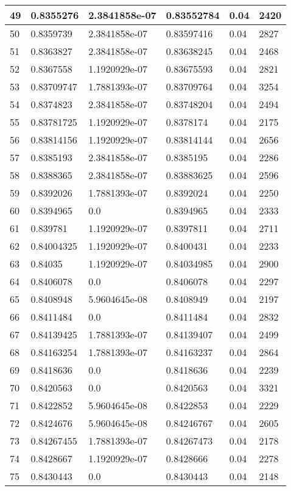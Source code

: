 \begin{longtable}{|l|l|l|l|l|l|}
49 & 0.8355276 & 2.3841858e-07 & 0.83552784 & 0.04 & 2420 \\ \hline 
50 & 0.8359739 & 2.3841858e-07 & 0.83597416 & 0.04 & 2827 \\ \hline 
51 & 0.8363827 & 2.3841858e-07 & 0.83638245 & 0.04 & 2468 \\ \hline 
52 & 0.8367558 & 1.1920929e-07 & 0.83675593 & 0.04 & 2821 \\ \hline 
53 & 0.83709747 & 1.7881393e-07 & 0.83709764 & 0.04 & 3254 \\ \hline 
54 & 0.8374823 & 2.3841858e-07 & 0.83748204 & 0.04 & 2494 \\ \hline 
55 & 0.83781725 & 1.1920929e-07 & 0.8378174 & 0.04 & 2175 \\ \hline 
56 & 0.83814156 & 1.1920929e-07 & 0.83814144 & 0.04 & 2656 \\ \hline 
57 & 0.8385193 & 2.3841858e-07 & 0.8385195 & 0.04 & 2286 \\ \hline 
58 & 0.8388365 & 2.3841858e-07 & 0.83883625 & 0.04 & 2596 \\ \hline 
59 & 0.8392026 & 1.7881393e-07 & 0.8392024 & 0.04 & 2250 \\ \hline 
60 & 0.8394965 & 0.0 & 0.8394965 & 0.04 & 2333 \\ \hline 
61 & 0.839781 & 1.1920929e-07 & 0.8397811 & 0.04 & 2711 \\ \hline 
62 & 0.84004325 & 1.1920929e-07 & 0.8400431 & 0.04 & 2233 \\ \hline 
63 & 0.84035 & 1.1920929e-07 & 0.84034985 & 0.04 & 2900 \\ \hline 
64 & 0.8406078 & 0.0 & 0.8406078 & 0.04 & 2297 \\ \hline 
65 & 0.8408948 & 5.9604645e-08 & 0.8408949 & 0.04 & 2197 \\ \hline 
66 & 0.8411484 & 0.0 & 0.8411484 & 0.04 & 2832 \\ \hline 
67 & 0.84139425 & 1.7881393e-07 & 0.84139407 & 0.04 & 2499 \\ \hline 
68 & 0.84163254 & 1.7881393e-07 & 0.84163237 & 0.04 & 2864 \\ \hline 
69 & 0.8418636 & 0.0 & 0.8418636 & 0.04 & 2239 \\ \hline 
70 & 0.8420563 & 0.0 & 0.8420563 & 0.04 & 3321 \\ \hline 
71 & 0.8422852 & 5.9604645e-08 & 0.8422853 & 0.04 & 2229 \\ \hline 
72 & 0.8424676 & 5.9604645e-08 & 0.84246767 & 0.04 & 2605 \\ \hline 
73 & 0.84267455 & 1.7881393e-07 & 0.84267473 & 0.04 & 2178 \\ \hline 
74 & 0.8428667 & 1.1920929e-07 & 0.8428666 & 0.04 & 2278 \\ \hline 
75 & 0.8430443 & 0.0 & 0.8430443 & 0.04 & 2148 \\ \hline 
\end{longtable}